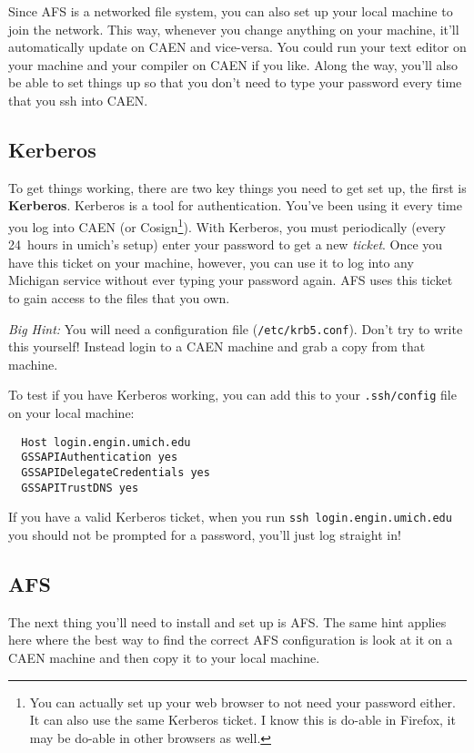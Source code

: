 \documentclass{article}
\begin{document}
Since AFS is a networked file system, you can also set up your local machine
to join the network.  This way, whenever you change anything on your machine,
it'll automatically update on CAEN and vice-versa. You could run your text
editor on your machine and your compiler on CAEN if you like. Along the way,
you'll also be able to set things up so that you don't need to type your
password every time that you ssh into CAEN.


\subsection*{Kerberos}

To get things working, there are two key things you need to get set up, the
first is \textbf{Kerberos}. Kerberos is a tool for authentication. You've been
using it every time you log into CAEN (or Cosign\footnote{
  You can actually set up your web browser to not need your password either.
  It can also use the same Kerberos ticket. I know this is do-able in Firefox,
  it may be do-able in other browsers as well.
}). With Kerberos, you must periodically (every 24~hours in umich's setup)
enter your password to get a new \emph{ticket}. Once you have this ticket on
your machine, however, you can use it to log into any Michigan service without
ever typing your password again. AFS uses this ticket to gain access to the
files that you own.

\emph{Big Hint:} You will need a configuration file (\texttt{/etc/krb5.conf}).
Don't try to write this yourself! Instead login to a CAEN machine and grab a
copy from that machine.

To test if you have Kerberos working, you can add this to your
\texttt{.ssh/config} file on your local machine:

\begin{lstlisting}
  Host login.engin.umich.edu
  GSSAPIAuthentication yes
  GSSAPIDelegateCredentials yes
  GSSAPITrustDNS yes
\end{lstlisting}

If you have a valid Kerberos ticket, when you run
\texttt{ssh~login.engin.umich.edu} you should not be prompted for a password,
you'll just log straight in!


\subsection*{AFS}

The next thing you'll need to install and set up is AFS. The same hint applies
here where the best way to find the correct AFS configuration is look at it on
a CAEN machine and then copy it to your local machine.
\end{document}
